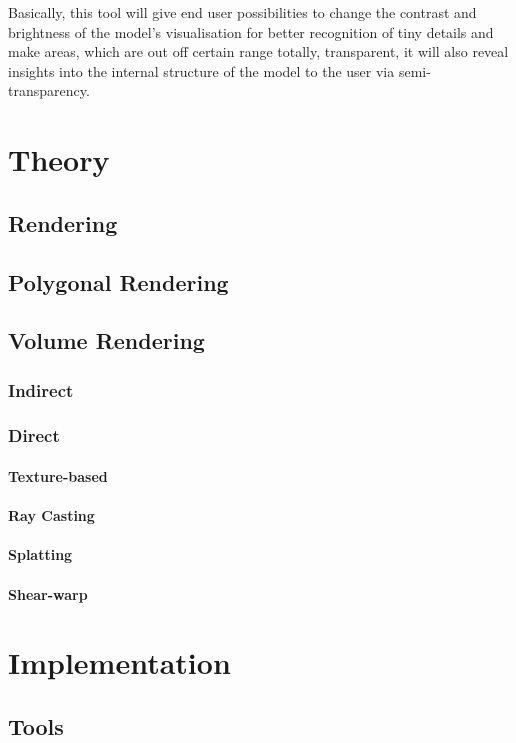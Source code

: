 \documentclass[english, 11pt]{report}
\begin{document}
Basically, this tool will give end user possibilities to change the contrast and brightness of the model's visualisation for better recognition of tiny details and make areas, which are out off certain range totally, transparent, it will also reveal insights into the internal structure of the model to the user via semi-transparency.

\chapter{Theory}
\section{Rendering}
\section{Polygonal Rendering}
\section{Volume Rendering}
\subsection{Indirect}
\subsection{Direct}
\subsubsection{Texture-based}
\subsubsection{Ray Casting}
\subsubsection{Splatting}
\subsubsection{Shear-warp}

\chapter{Implementation}
\section{Tools}
\end{document}

